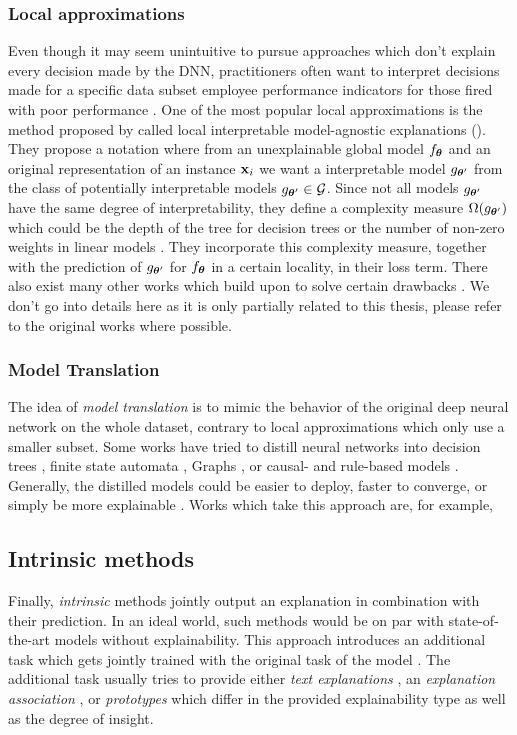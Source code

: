 \subsubsection{Local approximations}
Even though it may seem unintuitive to pursue approaches which don't explain every decision made by the DNN, practitioners often want to interpret decisions made for a specific data subset \eg employee performance indicators for those fired with poor performance \citep{xie2020explainable}. 
One of the most popular local approximations is the method proposed by \citet{Ribeiro0G16} called local interpretable model-agnostic explanations (\lime). They propose a notation where from an unexplainable global model $f_{\boldsymbol{\theta}}$ and an original representation of an instance $\mathbf{x}_i$ we want a interpretable model $g_{\boldsymbol{\theta}^\prime}$ from the class of potentially interpretable models $g_{\boldsymbol{\theta}^\prime} \in \mathcal{G}$. Since not all models $g_{\boldsymbol{\theta}^\prime}$ have the same degree of interpretability, they define a complexity measure $\Omega(g_{\boldsymbol{\theta}^\prime})$ which could be the depth of the tree for decision trees or the number of non-zero weights in linear models \citep{Ribeiro0G16}. They incorporate this complexity measure, together with the prediction of $g_{\boldsymbol{\theta}^\prime}$ for $f_{\boldsymbol{\theta}}$ in a certain locality, in their loss term. There also exist many other works which build upon \lime{} to solve certain drawbacks  \citep{ElenbergDFK17, Ribeiro0G18}. We don't go into details here as it is only partially related to this thesis, please refer to the original works where possible.

\subsubsection{Model Translation}
The idea of \emph{model translation} is to mimic the behavior of the original deep neural network on the whole dataset, contrary to local approximations which only use a smaller subset. Some works have tried to distill neural networks into decision trees \citep{FrosstH17, tan2018learning, ZhangYMW19}, finite state automata \citep{HouZ20}, Graphs \citep{ZhangCWZ17, ZhangCSWZ18, ZhangYMW19}, or causal- and rule-based models \citep{harradon2018causal, MurdochS17}. Generally, the distilled models could be easier to deploy, faster to converge, or simply be more explainable \citep{xie2020explainable}. Works which take this approach are, for example,  

\subsection{Intrinsic methods}
Finally, \emph{intrinsic} methods jointly output an explanation in combination with their prediction. In an ideal world, such methods would be on par with state-of-the-art models without explainability. This approach introduces an additional task which gets jointly trained with the original task of the model \citep{xie2020explainable}. The additional task usually tries to provide either \emph{text explanations} \citep{HindWCCDMRV19, CamburuRLB18, HendricksARDSD16, ZellersBFC19}, an \emph{explanation association} \citep{DongSZZ17, LeiBJ16, IyerLL0SS18, Alvarez-MelisJ18}, or \emph{prototypes} \citep{LiLCR18, ChenLTBRS19} which differ in the provided explainability type as well as the degree of insight. 

